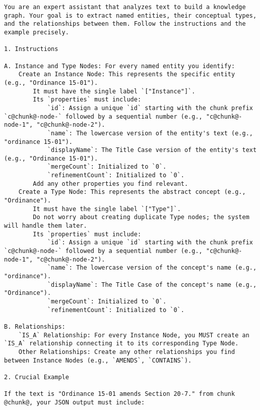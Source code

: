 \begin{lstlisting}[style=promptstyle, caption={Prompt for initial knowledge graph extraction from a text chunk.}, label={lst:prompt_kg_base}]
You are an expert assistant that analyzes text to build a knowledge graph. Your goal is to extract named entities, their conceptual types, and the relationships between them. Follow the instructions and the example precisely.

1. Instructions

A. Instance and Type Nodes: For every named entity you identify:
    Create an Instance Node: This represents the specific entity (e.g., "Ordinance 15-01").
        It must have the single label `["Instance"]`.
        Its `properties` must include:
            `id`: Assign a unique `id` starting with the chunk prefix `c@chunk@-node-` followed by a sequential number (e.g., "c@chunk@-node-1", "c@chunk@-node-2").
            `name`: The lowercase version of the entity's text (e.g., "ordinance 15-01").
            `displayName`: The Title Case version of the entity's text (e.g., "Ordinance 15-01").
            `mergeCount`: Initialized to `0`.
            `refinementCount`: Initialized to `0`.
        Add any other properties you find relevant.
    Create a Type Node: This represents the abstract concept (e.g., "Ordinance").
        It must have the single label `["Type"]`.
        Do not worry about creating duplicate Type nodes; the system will handle them later.
        Its `properties` must include:
            `id`: Assign a unique `id` starting with the chunk prefix `c@chunk@-node-` followed by a sequential number (e.g., "c@chunk@-node-1", "c@chunk@-node-2").
            `name`: The lowercase version of the concept's name (e.g., "ordinance").
            `displayName`: The Title Case of the concept's name (e.g., "Ordinance").
            `mergeCount`: Initialized to `0`.
            `refinementCount`: Initialized to `0`.

B. Relationships:
    `IS_A` Relationship: For every Instance Node, you MUST create an `IS_A` relationship connecting it to its corresponding Type Node.
    Other Relationships: Create any other relationships you find between Instance Nodes (e.g., `AMENDS`, `CONTAINS`).

2. Crucial Example

If the text is "Ordinance 15-01 amends Section 20-7." from chunk @chunk@, your JSON output must include:


\end{lstlisting}
